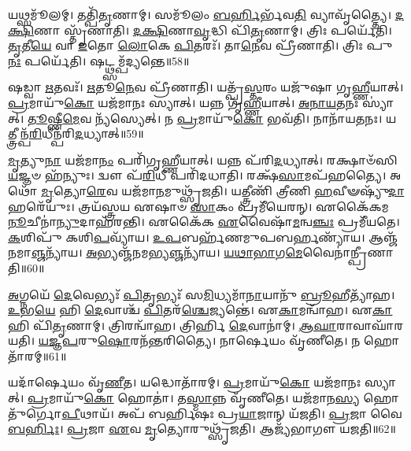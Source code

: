 𑌯𑌥𑍍𑌸𑌮𑍂᳴𑌲𑌮𑍍।
𑌤𑌤𑍍𑌪𑌿᳴\-\ul{𑌤𑍃}\-𑌣𑌾𑌮𑍍।
𑌸𑌮𑍂᳴𑌲𑌂 \ul{𑌬}\-\-\ul{𑌰𑍍}\-𑌹𑌿𑌰𑍍𑌭᳴𑌵\-\ul{𑌤𑌿} 𑌵𑍍𑌯𑌾𑌵𑍃᳴𑌤𑍍𑌤𑍍𑌯𑍈।
\-\ul{𑌦}\-\-\ul{𑌕𑍍𑌷𑌿}\-𑌣𑌾 𑌸𑍍𑌤𑍃᳴𑌣𑌾𑌤𑌿।
\-\ul{𑌦}\-\-\ul{𑌕𑍍𑌷𑌿}\-𑌣𑌾\-\ul{𑌵𑍃}\-𑌦𑍍𑌧𑌿 𑌪𑌿᳴\-\ul{𑌤𑍃}\-𑌣𑌾𑌮𑍍।
𑌤𑍍𑌰𑌿𑌃 𑌪𑌰𑍍𑌯𑍇᳴𑌤𑌿।
\-\ul{𑌤𑍃}\-𑌤𑍀\-\ul{𑌯𑍇} 𑌵𑌾 \ul{𑌇}\-𑌤𑍋 \ul{𑌲𑍋}\-𑌕𑍇 \ul{𑌪𑌿}\-𑌤𑌰𑌃᳴।
𑌤𑌾\-\ul{𑌨𑍇}\-𑌵 𑌪𑍍𑌰𑍀᳴𑌣𑌾𑌤𑌿।
𑌤𑍍𑌰𑌿𑌃 𑌪𑍁\-\ul{𑌨𑌃} 𑌪𑌰𑍍𑌯𑍇᳴𑌤𑌿।
𑌷𑌟𑍍𑌥𑍍𑌸𑌮𑍍𑌪᳴𑌦𑍍𑌯𑌨𑍍𑌤𑍇॥58॥

𑌷𑌡𑍍𑌵𑌾 \ul{𑌋}\-𑌤𑌵𑌃᳴।
\-\ul{𑌋}\-𑌤𑍂\-\ul{𑌨𑍇}\-𑌵 𑌪𑍍𑌰𑍀᳴𑌣𑌾𑌤𑌿।
𑌯𑌤𑍍𑌪𑍍𑌰᳴\-\ul{𑌸𑍍𑌤}\-𑌰𑌂 𑌯𑌜𑍁᳴𑌷𑌾 𑌗𑍃\-\ul{𑌹𑍍𑌣𑍀}\-𑌯𑌾𑌤𑍍।
\-\ul{𑌪𑍍𑌰}\-𑌮𑌾𑌯𑍁᳴\-\ul{𑌕𑍋} 𑌯𑌜᳴𑌮𑌾𑌨𑌃 𑌸𑍍𑌯𑌾𑌤𑍍।
𑌯𑌨𑍍𑌨 𑌗𑍃᳴\-\ul{𑌹𑍍𑌣𑍀}\-𑌯𑌾𑌤𑍍।
\-\ul{𑌅}\-\-\ul{𑌨𑌾}\-\-\ul{𑌯}\-\-\ul{𑌤}\-𑌨𑌃 𑌸𑍍𑌯𑌾॑𑌤𑍍।
\-\ul{𑌤𑍂}\-𑌷𑍍𑌣𑍀\-\ul{𑌮𑍇}\-𑌵 𑌨𑍍𑌯᳴𑌸𑍍𑌯𑍇𑌤𑍍।
𑌨 \ul{𑌪𑍍𑌰}\-𑌮𑌾𑌯𑍁᳴\-\ul{𑌕𑍋} 𑌭𑌵᳴𑌤𑌿।
𑌨𑌾𑌨𑌾᳴𑌯\-\ul{𑌤}\-𑌨𑌃।
𑌯𑌤𑍍𑌤𑍍𑌰𑍀𑌨𑍍𑌪᳴\-\ul{𑌰𑌿}\-𑌧𑍀𑌨𑍍𑌪᳴𑌰𑌿\-\ul{𑌦}\-𑌧𑍍𑌯𑌾𑌤𑍍॥59॥

\-\ul{𑌮𑍃}\-𑌤𑍍𑌯𑍁\-\ul{𑌨𑌾} 𑌯𑌜᳴𑌮𑌾\-\ul{𑌨𑌂} 𑌪𑌰𑌿᳴𑌗𑍃𑌹𑍍𑌣𑍀𑌯𑌾𑌤𑍍।
𑌯𑌨𑍍𑌨 𑌪᳴𑌰𑌿\-\ul{𑌦}\-𑌧𑍍𑌯𑌾𑌤𑍍।
𑌰𑌕𑍍𑌷𑌾𑍞᳴𑌸𑌿 \ul{𑌯}\-𑌜𑍍𑌞𑍞 𑌹᳴𑌨𑍍𑌯𑍁𑌃।
𑌦𑍍𑌵𑍗 𑌪᳴\-\ul{𑌰𑌿}\-𑌧𑍀 𑌪𑌰𑌿᳴𑌦𑌧𑌾𑌤𑌿।
𑌰𑌕𑍍𑌷᳴\-\ul{𑌸𑌾}\-𑌮𑌪᳴𑌹𑌤𑍍𑌯𑍈।
𑌅𑌥𑍋᳴ \ul{𑌮𑍃}\-𑌤𑍍𑌯𑍋\-\ul{𑌰𑍇}\-𑌵 𑌯𑌜᳴𑌮𑌾\-\ul{𑌨}\-𑌮𑍁𑌥𑍍𑌸𑍃᳴𑌜𑌤𑌿।
𑌯𑌤𑍍𑌤𑍍𑌰𑍀𑌣𑌿᳴ 𑌤𑍍𑌰𑍀𑌣𑌿 \ul{𑌹}\-𑌵𑍀𑍟𑌷𑍍𑌯𑍁᳴\-\ul{𑌦𑌾}\-𑌹𑌰𑍇᳴𑌯𑍁𑌃।
𑌤𑍍𑌰𑌯᳴𑌸𑍍𑌤𑍍𑌰𑌯 𑌏𑌷𑌾𑍞 \ul{𑌸𑌾}\-𑌕𑌂 𑌪𑍍𑌰𑌮𑍀᳴𑌯𑍇𑌰𑌨𑍍।
𑌏𑌕𑍈᳴𑌕𑌮\-\ul{𑌨𑍂}\-𑌚𑍀𑌨𑌾॑\-\ul{𑌨𑍍𑌯𑍁}\-𑌦𑌾𑌹᳴𑌰𑌨𑍍𑌤𑌿।
𑌏𑌕𑍈᳴𑌕 \ul{𑌏}\-𑌵𑍈𑌷𑌾᳴\-\ul{𑌮}\-𑌨𑍍𑌵\-\ul{𑌞𑍍𑌚𑌃} 𑌪𑍍𑌰𑌮𑍀᳴𑌯𑌤𑍇।
\-\ul{𑌕}\-𑌶𑌿𑌪𑍁᳴ 𑌕𑌶𑌿\-\ul{𑌪}\-𑌵𑍍𑌯𑌾᳴𑌯।
\-\ul{𑌉}\-\-\ul{𑌪}\-𑌬𑌰𑍍\mbox{}𑌹᳴𑌣𑌮𑍁𑌪𑌬𑌰𑍍\mbox{}\-\ul{𑌹}\-𑌣𑍍𑌯𑌾᳴𑌯।
𑌆𑌞𑍍𑌜᳴𑌨𑌮𑌾\-\ul{𑌞𑍍𑌜}\-𑌨𑍍𑌯𑌾᳴𑌯।
\-\ul{𑌅}\-𑌭𑍍𑌯𑌞𑍍𑌜᳴𑌨𑌮𑌭𑍍𑌯\-\ul{𑌞𑍍𑌜}\-𑌨𑍍𑌯𑌾᳴𑌯।
\-\ul{𑌯}\-\-\ul{𑌥𑌾}\-\-\ul{𑌭𑌾}\-𑌗\-\ul{𑌮𑍇}\-\-𑌵𑍈𑌨𑌾॑𑌨𑍍𑌪𑍍𑌰𑍀𑌣𑌾𑌤𑌿॥60॥

\-\ul{𑌅}\-𑌗𑍍𑌨𑌯𑍇᳴ \ul{𑌦𑍇}\-𑌵𑍇𑌭𑍍𑌯𑌃᳴ \ul{𑌪𑌿}\-𑌤𑍃𑌭𑍍𑌯𑌃᳴ 𑌸\-\ul{𑌮𑌿}\-𑌧𑍍𑌯𑌮𑌾᳴\-\ul{𑌨𑌾}\-𑌯𑌾𑌨𑍁᳴ \ul{𑌬𑍍𑌰𑍂}\-𑌹𑍀𑌤𑍍𑌯𑌾᳴𑌹।
\-\ul{𑌉}\-𑌭\-\ul{𑌯𑍇} 𑌹𑌿 \ul{𑌦𑍇}\-𑌵𑌾𑌶𑍍𑌚᳴ \ul{𑌪𑌿}\-𑌤𑌰᳴\-\ul{𑌶𑍍𑌚𑍇}\-𑌜𑍍𑌯𑌨𑍍𑌤𑍇॑।
𑌏\-\ul{𑌕𑌾}\-𑌮𑌨𑍍𑌵𑌾᳴𑌹।
𑌏\-\ul{𑌕𑌾} 𑌹𑌿 𑌪𑌿᳴\-\ul{𑌤𑍃}\-𑌣𑌾𑌮𑍍।
𑌤𑍍𑌰𑌿𑌰𑌨𑍍𑌵𑌾᳴𑌹।
𑌤𑍍𑌰𑌿𑌰𑍍\mbox{}𑌹𑌿 \ul{𑌦𑍇}\-𑌵𑌾𑌨𑌾॑𑌮𑍍।
\-\ul{𑌆}\-\-\ul{𑌘𑌾}\-𑌰𑌾𑌵𑌾𑌘𑌾᳴𑌰𑌯𑌤𑌿।
\-\ul{𑌯}\-\-\ul{𑌜𑍍𑌞}\-\-\ul{𑌪}\-𑌰𑍁\-\ul{𑌷𑍋}\-𑌰𑌨᳴𑌨𑍍𑌤𑌰𑌿𑌤𑍍𑌯𑍈।
𑌨𑌾𑌰𑍍\mbox{}\-\ul{𑌷𑍇}\-𑌯𑌂 𑌵𑍃᳴𑌣𑍀𑌤𑍇।
𑌨 𑌹𑍋𑌤𑌾᳴𑌰𑌮𑍍॥61॥

𑌯𑌦𑌾᳴𑌰𑍍\mbox{}\-\ul{𑌷𑍇}\-𑌯𑌂 𑌵𑍃᳴\-\ul{𑌣𑍀}\-𑌤।
𑌯𑌦𑍍𑌧𑍋𑌤𑌾᳴𑌰𑌮𑍍।
\-\ul{𑌪𑍍𑌰}\-𑌮𑌾𑌯𑍁᳴\-\ul{𑌕𑍋} 𑌯𑌜᳴𑌮𑌾𑌨𑌃 𑌸𑍍𑌯𑌾𑌤𑍍।
\-\ul{𑌪𑍍𑌰}\-𑌮𑌾𑌯𑍁᳴\-\ul{𑌕𑍋} 𑌹𑍋𑌤𑌾॑।
𑌤\-\ul{𑌸𑍍𑌮𑌾}\-𑌨𑍍𑌨 𑌵𑍃᳴𑌣𑍀𑌤𑍇।
𑌯𑌜᳴𑌮𑌾𑌨\-\ul{𑌸𑍍𑌯} 𑌹𑍋𑌤𑍁᳴𑌰𑍍𑌗𑍋\-\ul{𑌪𑍀}\-𑌥𑌾𑌯᳴।
𑌅𑌪᳴ 𑌬𑌰𑍍\mbox{}𑌹𑌿𑌷𑌃 𑌪𑍍𑌰\-\ul{𑌯𑌾}\-𑌜𑌾𑌨𑍍 𑌯᳴𑌜𑌤𑌿।
\-\ul{𑌪𑍍𑌰}\-𑌜𑌾 𑌵𑍈 \ul{𑌬}\-\-\ul{𑌰𑍍}\-𑌹𑌿𑌃।
\-\ul{𑌪𑍍𑌰}\-𑌜𑌾 \ul{𑌏}\-𑌵 \ul{𑌮𑍃}\-𑌤𑍍𑌯𑍋𑌰𑍁𑌥𑍍𑌸𑍃᳴𑌜𑌤𑌿।
𑌆𑌜𑍍𑌯᳴𑌭𑌾𑌗𑍗 𑌯𑌜𑌤𑌿॥62॥

